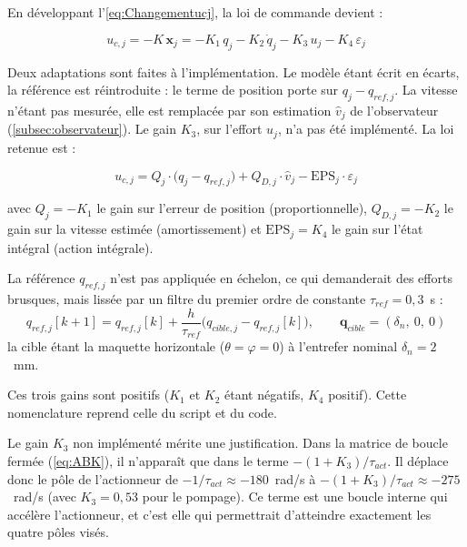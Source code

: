 En développant l'\autoref{eq:Changementucj}, la loi de commande devient :

\begin{equation}
    u_{c,j} = -K\,\boldsymbol x_j
    = -K_1\,q_j - K_2\,\dot q_j - K_3\,u_j - K_4\,\varepsilon_j
\end{equation}

Deux adaptations sont faites à l'implémentation. Le modèle étant écrit en écarts, la référence est réintroduite : le terme de position porte sur $q_j - q_{ref,j}$. La vitesse n'étant pas mesurée, elle est remplacée par son estimation $\hat v_j$ de l'observateur (\autoref{subsec:observateur}). Le gain $K_3$, sur l'effort $u_j$, n'a pas été implémenté. La loi retenue est :

\begin{equation}
    u_{c,j} = Q_j \cdot \bigl(q_j - q_{ref,j}\bigr)
    + Q_{D,j} \cdot \hat v_j
    - \mathrm{EPS}_j \cdot \varepsilon_j
    \label{eq:loi-commande}
\end{equation}

avec $Q_j = -K_1$ le gain sur l'erreur de position (proportionnelle), $Q_{D,j} = -K_2$ le gain sur la vitesse estimée (amortissement) et $\mathrm{EPS}_j = K_4$ le gain sur l'état intégral (action intégrale).

La référence $q_{ref,j}$ n'est pas appliquée en échelon, ce qui demanderait des efforts brusques, mais lissée par un filtre du premier ordre de constante $\tau_{ref} = 0{,}3$~s :
\begin{equation}
    q_{ref,j}[k+1] = q_{ref,j}[k]
    + \frac{h}{\tau_{ref}}\bigl(q_{cible,j} - q_{ref,j}[k]\bigr),
    \qquad
    \boldsymbol{q}_{cible} = (\delta_n,\ 0,\ 0)
    \label{eq:lissage-ref}
\end{equation}
la cible étant la maquette horizontale ($\theta = \varphi = 0$) à l'entrefer nominal $\delta_n = 2$~mm.

Ces trois gains sont positifs ($K_1$ et $K_2$ étant négatifs, $K_4$ positif). Cette nomenclature reprend celle du script et du code.

Le gain $K_3$ non implémenté mérite une justification. Dans la matrice de boucle fermée (\autoref{eq:ABK}), il n'apparaît que dans le terme $-(1+K_3)/\tau_{act}$. Il déplace donc le pôle de l'actionneur de $-1/\tau_{act} \approx -180$~rad/s à $-(1+K_3)/\tau_{act} \approx -275$~rad/s (avec $K_3 = 0{,}53$ pour le pompage). Ce terme est une boucle interne qui accélère l'actionneur, et c'est elle qui permettrait d'atteindre exactement les quatre pôles visés.

